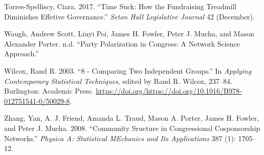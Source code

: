 \documentclass[12pt,]{article}
\begin{document}
\leavevmode\hypertarget{ref-torres-spelliscy2017}{}%
Torres-Spelliscy, Ciara. 2017. ``Time Suck: How the Fundraising
Treadmill Diminishes Effetive Governance.'' \emph{Seton Hall Legislative
Journal} 42 (December).

\leavevmode\hypertarget{ref-waugh2009}{}%
Waugh, Andrew Scott, Liuyi Pei, James H. Fowler, Peter J. Mucha, and
Mason Alexander Porter. n.d. ``Party Polarization in Congress: A Network
Science Approach.''

\leavevmode\hypertarget{ref-wilcox2003}{}%
Wilcox, Rand R. 2003. ``8 - Comparing Two Independent Groups.'' In
\emph{Applying Contemporary Statistical Techniques}, edited by Rand R.
Wilcox, 237--84. Burlington: Academic Press.
\url{https://doi.org/https://doi.org/10.1016/B978-012751541-0/50029-8}.

\leavevmode\hypertarget{ref-zhang2008}{}%
Zhang, Yan, A. J. Friend, Amanda L. Traud, Mason A. Porter, James H.
Fowler, and Peter J. Mucha. 2008. ``Community Sructure in Congressional
Cosponsorship Networks.'' \emph{Physica A: Statistical MEchanics and Its
Applications} 387 (1): 1705--12.





\newpage
\singlespacing 
\end{document}
